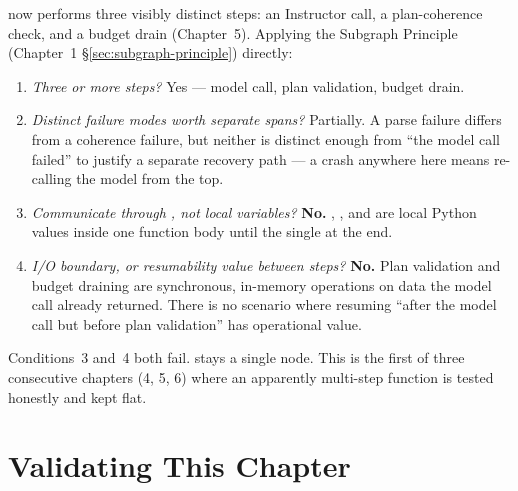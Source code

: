  now performs three visibly distinct steps: an
Instructor call, a plan-coherence check, and a budget drain (Chapter~5).
Applying the Subgraph Principle (Chapter~1 §\ref{sec:subgraph-principle})
directly:

\begin{takeawaybox}
\begin{enumerate}
  \item \emph{Three or more steps?}  Yes --- model call, plan validation,
        budget drain.
  \item \emph{Distinct failure modes worth separate spans?}  Partially.
        A parse failure differs from a coherence failure, but neither
        is distinct enough from ``the model call failed'' to justify a
        separate recovery path --- a crash anywhere here means
        re-calling the model from the top.
  \item \emph{Communicate through , not local variables?}
        \textbf{No.}  , , and
         are local Python values inside one function
        body until the single  at the end.
  \item \emph{I/O boundary, or resumability value between steps?}
        \textbf{No.}  Plan validation and budget draining are
        synchronous, in-memory operations on data the model call already
        returned.  There is no scenario where resuming ``after the model
        call but before plan validation'' has operational value.
\end{enumerate}
Conditions~3 and~4 both fail.   stays a single node.
This is the first of three consecutive chapters (4, 5, 6) where an
apparently multi-step function is tested honestly and kept flat.
\end{takeawaybox}

\section{Validating This Chapter}
\label{sec:ch4-tests}

